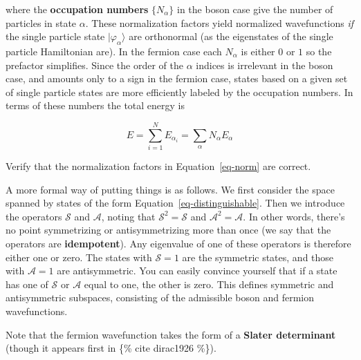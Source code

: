 \documentclass[
  a4paper,
]{scrbook}
\begin{document}
where the \textbf{occupation numbers} \(\{N_{\alpha}\}\) in the boson
case give the number of particles in state \(\alpha\). These
normalization factors yield normalized wavefunctions \emph{if} the
single particle state \(\lvert{\varphi_\alpha}\rangle\) are orthonormal
(as the eigenstates of the single particle Hamiltonian are). In the
fermion case each \(N_{\alpha}\) is either \(0\) or \(1\) so the
prefactor simplifies. Since the order of the \(\alpha\) indices is
irrelevant in the boson case, and amounts only to a sign in the fermion
case, states based on a given set of single particle states are more
efficiently labeled by the occupation numbers. In terms of these numbers
the total energy is

\[
 \label{quantum_statistics_TotalEnergy}
 E=\sum_{i=1}^{N}E_{\alpha_{i}}=\sum_{\alpha}N_{\alpha} E_{\alpha}
\]

\begin{tcolorbox}[enhanced jigsaw, rightrule=.15mm, opacityback=0, bottomtitle=1mm, colbacktitle=quarto-callout-tip-color!10!white, colback=white, toprule=.15mm, titlerule=0mm, arc=.35mm, title=\textcolor{quarto-callout-tip-color}{\faLightbulb}\hspace{0.5em}{Check}, left=2mm, opacitybacktitle=0.6, breakable, leftrule=.75mm, bottomrule=.15mm, colframe=quarto-callout-tip-color-frame, toptitle=1mm, coltitle=black]

Verify that the normalization factors in Equation~\ref{eq-norm} are
correct.

\end{tcolorbox}

A more formal way of putting things is as follows. We first consider the
space spanned by states of the form Equation~\ref{eq-distinguishable}.
Then we introduce the operators \(\mathcal{S}\) and \(\mathcal{A}\),
noting that \(\mathcal{S}^{2}=\mathcal{S}\) and
\(\mathcal{A}^{2}=\mathcal{A}\). In other words, there's no point
symmetrizing or antisymmetrizing more than once (we say that the
operators are \textbf{idempotent}). Any eigenvalue of one of these
operators is therefore either one or zero. The states with
\(\mathcal{S}=1\) are the symmetric states, and those with
\(\mathcal{A}=1\) are antisymmetric. You can easily convince yourself
that if a state has one of \(\mathcal{S}\) or \(\mathcal{A}\) equal to
one, the other is zero. This defines symmetric and antisymmetric
subspaces, consisting of the admissible boson and fermion wavefunctions.

Note that the fermion wavefunction takes the form of a \textbf{Slater
determinant} (though it appears first in \{\% cite dirac1926 \%\}).
\end{document}
